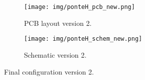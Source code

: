 \begin{figure}
\centering
    \begin{subfigure}{\columnwidth}
    \centering%
    \texttt{[image: img/ponteH\_pcb\_new.png]}
    \caption{PCB layout version 2.}
    \label{fig:new_layout}%
    \end{subfigure}

    \begin{subfigure}{\columnwidth}
    \centering%
    \texttt{[image: img/ponteH\_schem\_new.png]}
    \caption{Schematic version 2.}
    \label{fig:new_schem}%
    \end{subfigure}

\label{fig:h_schem_v2}%
\caption{Final configuration version 2.}
\end{figure}
